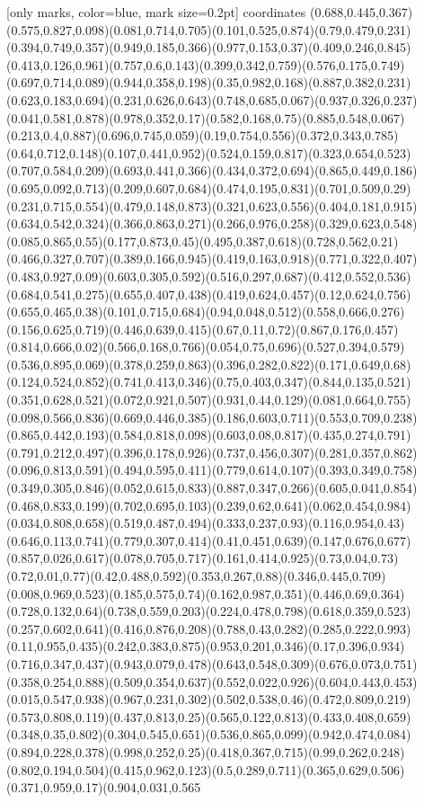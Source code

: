 [only marks, color=blue, mark size=0.2pt] coordinates 
{
(0.688,0.445,0.367)(0.575,0.827,0.098)(0.081,0.714,0.705)(0.101,0.525,0.874)(0.79,0.479,0.231)(0.394,0.749,0.357)(0.949,0.185,0.366)(0.977,0.153,0.37)(0.409,0.246,0.845)(0.413,0.126,0.961)(0.757,0.6,0.143)(0.399,0.342,0.759)(0.576,0.175,0.749)(0.697,0.714,0.089)(0.944,0.358,0.198)(0.35,0.982,0.168)(0.887,0.382,0.231)(0.623,0.183,0.694)(0.231,0.626,0.643)(0.748,0.685,0.067)(0.937,0.326,0.237)(0.041,0.581,0.878)(0.978,0.352,0.17)(0.582,0.168,0.75)(0.885,0.548,0.067)(0.213,0.4,0.887)(0.696,0.745,0.059)(0.19,0.754,0.556)(0.372,0.343,0.785)(0.64,0.712,0.148)(0.107,0.441,0.952)(0.524,0.159,0.817)(0.323,0.654,0.523)(0.707,0.584,0.209)(0.693,0.441,0.366)(0.434,0.372,0.694)(0.865,0.449,0.186)(0.695,0.092,0.713)(0.209,0.607,0.684)(0.474,0.195,0.831)(0.701,0.509,0.29)(0.231,0.715,0.554)(0.479,0.148,0.873)(0.321,0.623,0.556)(0.404,0.181,0.915)(0.634,0.542,0.324)(0.366,0.863,0.271)(0.266,0.976,0.258)(0.329,0.623,0.548)(0.085,0.865,0.55)(0.177,0.873,0.45)(0.495,0.387,0.618)(0.728,0.562,0.21)(0.466,0.327,0.707)(0.389,0.166,0.945)(0.419,0.163,0.918)(0.771,0.322,0.407)(0.483,0.927,0.09)(0.603,0.305,0.592)(0.516,0.297,0.687)(0.412,0.552,0.536)(0.684,0.541,0.275)(0.655,0.407,0.438)(0.419,0.624,0.457)(0.12,0.624,0.756)(0.655,0.465,0.38)(0.101,0.715,0.684)(0.94,0.048,0.512)(0.558,0.666,0.276)(0.156,0.625,0.719)(0.446,0.639,0.415)(0.67,0.11,0.72)(0.867,0.176,0.457)(0.814,0.666,0.02)(0.566,0.168,0.766)(0.054,0.75,0.696)(0.527,0.394,0.579)(0.536,0.895,0.069)(0.378,0.259,0.863)(0.396,0.282,0.822)(0.171,0.649,0.68)(0.124,0.524,0.852)(0.741,0.413,0.346)(0.75,0.403,0.347)(0.844,0.135,0.521)(0.351,0.628,0.521)(0.072,0.921,0.507)(0.931,0.44,0.129)(0.081,0.664,0.755)(0.098,0.566,0.836)(0.669,0.446,0.385)(0.186,0.603,0.711)(0.553,0.709,0.238)(0.865,0.442,0.193)(0.584,0.818,0.098)(0.603,0.08,0.817)(0.435,0.274,0.791)(0.791,0.212,0.497)(0.396,0.178,0.926)(0.737,0.456,0.307)(0.281,0.357,0.862)(0.096,0.813,0.591)(0.494,0.595,0.411)(0.779,0.614,0.107)(0.393,0.349,0.758)(0.349,0.305,0.846)(0.052,0.615,0.833)(0.887,0.347,0.266)(0.605,0.041,0.854)(0.468,0.833,0.199)(0.702,0.695,0.103)(0.239,0.62,0.641)(0.062,0.454,0.984)(0.034,0.808,0.658)(0.519,0.487,0.494)(0.333,0.237,0.93)(0.116,0.954,0.43)(0.646,0.113,0.741)(0.779,0.307,0.414)(0.41,0.451,0.639)(0.147,0.676,0.677)(0.857,0.026,0.617)(0.078,0.705,0.717)(0.161,0.414,0.925)(0.73,0.04,0.73)(0.72,0.01,0.77)(0.42,0.488,0.592)(0.353,0.267,0.88)(0.346,0.445,0.709)(0.008,0.969,0.523)(0.185,0.575,0.74)(0.162,0.987,0.351)(0.446,0.69,0.364)(0.728,0.132,0.64)(0.738,0.559,0.203)(0.224,0.478,0.798)(0.618,0.359,0.523)(0.257,0.602,0.641)(0.416,0.876,0.208)(0.788,0.43,0.282)(0.285,0.222,0.993)(0.11,0.955,0.435)(0.242,0.383,0.875)(0.953,0.201,0.346)(0.17,0.396,0.934)(0.716,0.347,0.437)(0.943,0.079,0.478)(0.643,0.548,0.309)(0.676,0.073,0.751)(0.358,0.254,0.888)(0.509,0.354,0.637)(0.552,0.022,0.926)(0.604,0.443,0.453)(0.015,0.547,0.938)(0.967,0.231,0.302)(0.502,0.538,0.46)(0.472,0.809,0.219)(0.573,0.808,0.119)(0.437,0.813,0.25)(0.565,0.122,0.813)(0.433,0.408,0.659)(0.348,0.35,0.802)(0.304,0.545,0.651)(0.536,0.865,0.099)(0.942,0.474,0.084)(0.894,0.228,0.378)(0.998,0.252,0.25)(0.418,0.367,0.715)(0.99,0.262,0.248)(0.802,0.194,0.504)(0.415,0.962,0.123)(0.5,0.289,0.711)(0.365,0.629,0.506)(0.371,0.959,0.17)(0.904,0.031,0.565}
